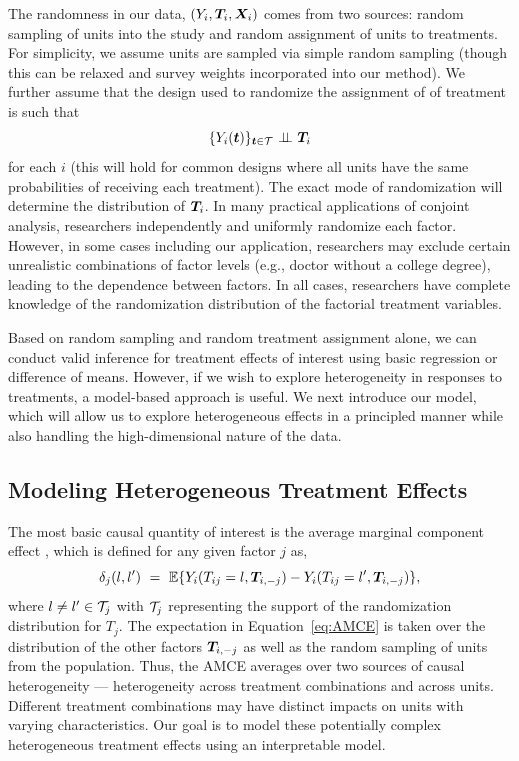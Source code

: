 The randomness in our data, $(Y_i, \bm{T}_i, \bm{X}_i)$ comes from two sources: random sampling of units into the study and random assignment of units to treatments.
For simplicity, we assume units are sampled via simple random sampling (though this can be relaxed and survey weights incorporated into our method).
We further assume that the design used to randomize the assignment of of treatment is such that
\begin{equation*}
  \{Y_i(\bt)\}_{\bt \in \cT} \ \ind \  \bT_i
\end{equation*}
for each $i$ (this will hold for common designs where all units have the same probabilities of receiving each treatment).
The exact mode of randomization will determine the distribution of $\bm{T}_i$.
In many practical applications of conjoint analysis,
researchers independently and uniformly randomize each factor.
However, in some cases including our application, researchers may
exclude certain unrealistic combinations of factor levels (e.g.,
doctor without a college degree), leading to the dependence between
factors.  In all cases, researchers have complete knowledge of the
randomization distribution of the factorial treatment variables.

Based on random sampling and random treatment assignment alone, we can conduct valid inference for treatment effects of interest using basic regression or difference of means.
However, if we wish to explore heterogeneity in responses to treatments, a model-based approach is useful.
We next introduce our model, which will allow us to explore heterogeneous effects in a principled manner while also handling the high-dimensional nature of the data.


\subsection{Modeling Heterogeneous Treatment Effects}

The most basic causal quantity of interest is the average marginal
component effect \citep[AMCE;][]{hainmueller2014causal}, which is
defined for any given factor $j$ as,
\begin{equation}
  \delta_j (l, l^\prime) \ = \ \E\{Y_i(T_{ij}=l, \bT_{i,-j}) - Y_i(T_{ij}
  = l^\prime, \bT_{i,-j})\}, \label{eq:AMCE}
\end{equation}
where $l \ne l^\prime \in \mathcal{T}_j$ with $\mathcal{T}_j$ representing the support
of the randomization distribution for $T_j$.  The expectation in
Equation~\eqref{eq:AMCE} is taken over the distribution of the other
factors $\bm{T}_{i,-j}$ as well as the random sampling of units from the
population.  Thus, the AMCE averages over two sources of causal
heterogeneity --- heterogeneity across treatment combinations and
across units.  Different treatment combinations may have distinct
impacts on units with varying characteristics.  Our goal is to model
these potentially complex heterogeneous treatment effects using an
interpretable model.

